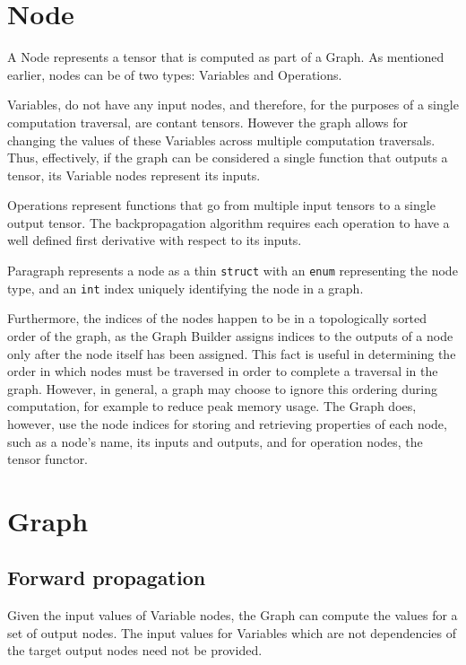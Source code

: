 \documentclass{article}
\begin{document}
\section{Node}
  A Node represents a tensor that is computed as part of a Graph.
  As mentioned earlier, nodes can be of two types: Variables and Operations.
  
  Variables, do not have any input nodes, and therefore,
  for the purposes of a single computation traversal, are contant tensors.
  However the graph allows for changing the values of these Variables
  across multiple computation traversals.
  Thus, effectively, if the graph can be considered a single function
  that outputs a tensor, its Variable nodes represent its inputs.
  
  Operations represent functions that go from multiple input tensors
  to a single output tensor.
  The backpropagation algorithm requires each operation to have 
  a well defined first derivative with respect to its inputs.
  
  Paragraph represents a node as a thin \texttt{struct}
  with an \texttt{enum} representing the node type,
  and an \texttt{int} index uniquely identifying the node in a graph.
  
  Furthermore, the indices of the nodes happen to be in a
  topologically sorted order of the graph,
  as the Graph Builder assigns indices to the outputs of a node
  only after the node itself has been assigned.
  This fact is useful in determining the order in which
  nodes must be traversed in order to complete a traversal in the graph.
  However, in general, a graph may choose to ignore this ordering
  during computation, for example to reduce peak memory usage.
  The Graph does, however, use the node indices for storing and retrieving
  properties of each node, such as a node's name, its inputs and outputs,
  and for operation nodes, the tensor functor.
  
\section{Graph}
  \subsection{Forward propagation}
    Given the input values of Variable nodes, the Graph can compute
    the values for a set of output nodes.
    The input values for Variables which are not dependencies of the 
    target output nodes need not be provided.
  
\end{document}
